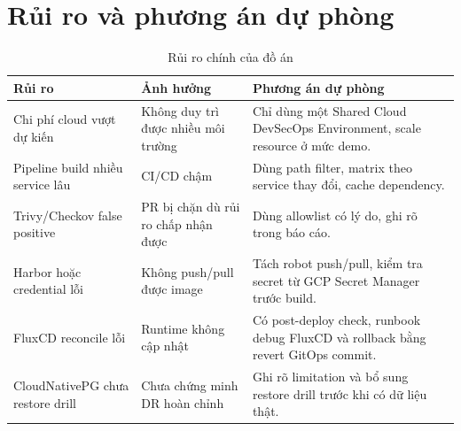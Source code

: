 \section{Rủi ro và phương án dự phòng}

\begin{table}[H]
\centering
\caption{Rủi ro chính của đồ án}
\label{tab:risks}
\begin{tabularx}{\textwidth}{|p{}|p{}|Y|}
\hline
\textbf{Rủi ro} & \textbf{Ảnh hưởng} & \textbf{Phương án dự phòng} \\
\hline
Chi phí cloud vượt dự kiến & Không duy trì được nhiều môi trường & Chỉ dùng một Shared Cloud DevSecOps Environment, scale resource ở mức demo. \\
Pipeline build nhiều service lâu & CI/CD chậm & Dùng path filter, matrix theo service thay đổi, cache dependency. \\
Trivy/Checkov false positive & PR bị chặn dù rủi ro chấp nhận được & Dùng allowlist có lý do, ghi rõ trong báo cáo. \\
Harbor hoặc credential lỗi & Không push/pull được image & Tách robot push/pull, kiểm tra secret từ GCP Secret Manager trước build. \\
FluxCD reconcile lỗi & Runtime không cập nhật & Có post-deploy check, runbook debug FluxCD và rollback bằng revert GitOps commit. \\
CloudNativePG chưa restore drill & Chưa chứng minh DR hoàn chỉnh & Ghi rõ limitation và bổ sung restore drill trước khi có dữ liệu thật. \\
\hline
\end{tabularx}
\end{table}
